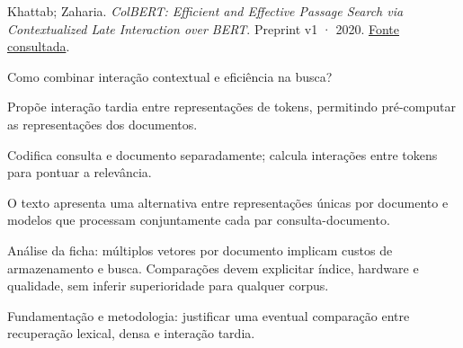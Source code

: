 {\small Khattab; Zaharia. \textit{{ColBERT}: Efficient and Effective Passage Search via Contextualized Late Interaction over {BERT}}. Preprint v1 · 2020. \href{https://arxiv.org/pdf/2004.12832v1}{Fonte consultada}.\par}

Como combinar interação contextual e eficiência na busca?

Propõe interação tardia entre representações de tokens, permitindo pré-computar as representações dos documentos.

Codifica consulta e documento separadamente; calcula interações entre tokens para pontuar a relevância.

O texto apresenta uma alternativa entre representações únicas por documento e modelos que processam conjuntamente cada par consulta-documento.

\begin{itemize}
\end{itemize}

Análise da ficha: múltiplos vetores por documento implicam custos de armazenamento e busca. Comparações devem explicitar índice, hardware e qualidade, sem inferir superioridade para qualquer corpus.

Fundamentação e metodologia: justificar uma eventual comparação entre recuperação lexical, densa e interação tardia.

